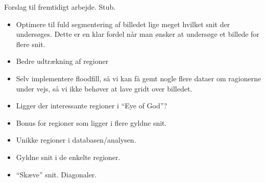 {
{\sffamily Forslag til fremtidigt arbejde. Stub.
}

\begin{itemize}
    \item Optimere til fuld segmentering af billedet lige meget hvilket
        snit der undersøges. Dette er en klar fordel når man ønsker at
        undersøge et billede for flere snit.
    \item Bedre udtrækning af regioner
    \item Selv implementere floodfill, så vi kan få gemt nogle flere
    dataer om ragionerne under vejs, så vi ikke behøver at lave gridt
    over billedet.
    \item Ligger der interessante regioner i ``Eye of God''?
    \item Bonus for regioner som ligger i flere gyldne snit.
    \item Unikke regioner i databasen/analysen.
    \item Gyldne snit i de enkelte regioner.
    \item ``Skæve'' snit. Diagonaler.
\end{itemize}

%
}


